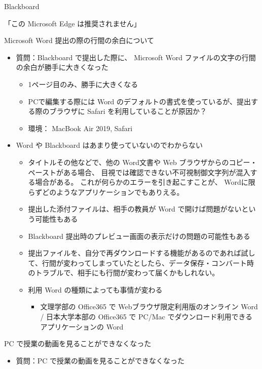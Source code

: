 \documentclass[a4j,10pt]{jsarticle}
\begin{document}
{\begin{frame}[label={sec:orgc119bb0},fragile]{Blackboard}
\begin{block}{「この Microsoft Edge は推奨されません」}
\end{block}
\par
\begin{block}{Microsoft Word 提出の際の行間の余白について}
\begin{itemize}
\item 質問：Blackboard で提出した際に、 Microsoft Word ファイルの文字の行間の余白が勝手に大きくなった
\begin{itemize}
\item 1ページ目のみ、勝手に大きくなる
\item PCで編集する際には Word のデフォルトの書式を使っているが、提出する際のブラウザに Safari を利用していることが原因か？
\item 環境： MacBook Air 2019,  Safari
\end{itemize}
\par
\item Word や Blackboard はあまり使っていないのでわからない
\begin{itemize}
\item タイトルその他などで、他の Word文書や Web ブラウザからのコピー・ペーストがある場合、
目視では確認できない不可視制御文字列が混入する場合がある。
これが何らかのエラーを引き起こすことが、 Wordに限らずどのようなアプリケーションでもありえる。
\item 提出した添付ファイルは、相手の教員が Word で開けば問題がないという可能性もある
\item Blackboard 提出時のプレビュー画面の表示だけの問題の可能性もある
\item 提出ファイルを、自分で再ダウンロードする機能があるのであれば試して、行間が変わってしまっていたとしたら、データ保存・コンバート時のトラブルで、相手にも行間が変わって届くかもしれない。
\item 利用 Word の種類によっても事情が変わる
\begin{itemize}
\item 文理学部の Office365 で Webブラウザ限定利用版のオンライン Word / 日本大学本部の Office365 で PC/Mac でダウンロード利用できるアプリケーションの Word
\end{itemize}
\end{itemize}
\end{itemize}
\end{block}
\par
\begin{block}{PC で授業の動画を見ることができなくなった}
\begin{itemize}
\item 質問：PC で授業の動画を見ることができなくなった

\end{itemize}
\end{block}
\end{frame}}
\end{document}
